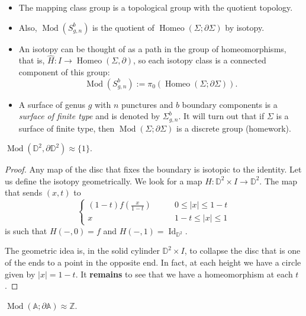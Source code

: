 \begin{remark}
\label{remark-mapping-class-group}
\begin{itemize}
\item The mapping class group is a
topological group with the quotient
topology.
\item Also,
$\operatorname{Mod}(S_{g,n}^b)$ is the
quotient of
$\operatorname{Homeo}
(\Sigma;\partial\Sigma)$
by isotopy.
\item An isotopy can be thought of as a
path in the group of homeomorphisms,
that is,
$\hat{H}:I\to
\operatorname{Homeo}(\Sigma,\partial)$,
so each isotopy class is a connected
component of this group:
$$
\operatorname{Mod}(S_{g,n}^b):=
\pi_0(\operatorname{Homeo}
(\Sigma;\partial\Sigma)).
$$
\item A surface of genus $g$ with $n$
punctures and $b$ boundary components is
a {\it surface of finite type} and is
denoted by $\Sigma^b_{g,n}$. It will
turn out that if $\Sigma$ is a surface
of finite type, then
$\operatorname{Mod}
(\Sigma;\partial\Sigma)$
is a discrete group (homework).
\end{itemize}
\end{remark}

\begin{example}
\label{example-mod-disc}
$\operatorname{Mod}
(\mathbb{D}^2,\partial\mathbb{D}^2)
\approx\{1\}$.
\end{example}

\begin{proof}
Any map of the disc that fixes the
boundary is isotopic to the identity.
Let us define the isotopy geometrically.
We look for a map
$H:\mathbb{D}^2\times I\to\mathbb{D}^2$.
The map that sends $(x,t)$ to
$$
\begin{cases}
(1-t)f(\frac{x}{1-t})
&\qquad0\leq|x|\leq1-t\\
x&\qquad1-t\leq|x|\leq1
\end{cases}
$$
is such that $H(-,0)=f$ and
$H(-,1)=\operatorname{Id}_{\mathbb{D}^2}$.

The geometric idea is, in the solid
cylinder $\mathbb{D}^2\times I$, to
collapse the disc that is one of the
ends to a point in the opposite end. In
fact, at each height we have a circle
given by $|x|=1-t$. It {\bf remains} to
see that we have a homeomorphism at
each $t$.
\end{proof}

\begin{example}
\label{example-mod-annulus}
$\operatorname{Mod}
(\mathbb{A};\partial\mathbb{A})
\approx\mathbb{Z}$.
\end{example}

